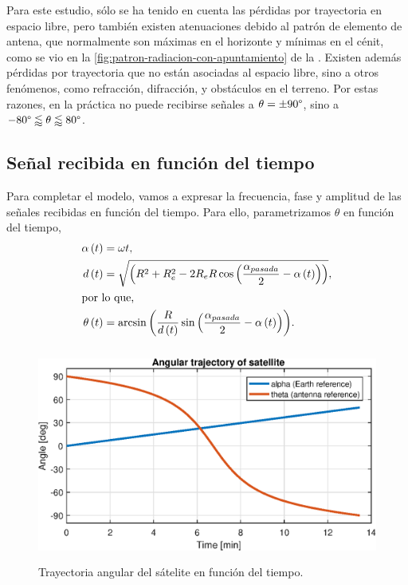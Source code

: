 \documentclass{article}
\newenvironment{standalone}{\begin{preview}}{\end{preview}}
\begin{document}
\begin{standalone}
  Para este estudio, sólo se ha tenido en cuenta las pérdidas por trayectoria en espacio libre, pero también existen atenuaciones debido al patrón de elemento de antena, que normalmente son máximas en el horizonte y mínimas en el cénit, como se vio en la \cref{fig:patron-radiacion-con-apuntamiento} de la .
  Existen además pérdidas por trayectoria que no están asociadas al espacio libre, sino a otros fenómenos, como refracción, difracción, y obstáculos en el terreno.
  Por estas razones, en la práctica no puede recibirse señales a $\theta = \pm 90 \degree$, sino a $-80\degree \lessapprox \theta \lessapprox 80\degree$.


  \subsection{Señal recibida en función del tiempo}

  Para completar el modelo, vamos a expresar la frecuencia, fase y amplitud de las señales recibidas en función del tiempo.
  Para ello, parametrizamos $\theta$ en función del tiempo,
  \begin{align}
    \alpha \left( t \right) &= \omega t, \\
    d \left( t \right) &= \sqrt{ \left( R^2 + R_e^2 - 2 R_e R \cos{ \left( \frac{\alpha_{pasada}}{2} - \alpha \left( t \right) \right) } \right) }, \\
    \intertext{por lo que,}
    \theta \left( t \right) &= \arcsin{ \left( \frac{R}{d \left( t \right) } \sin{ \left( \frac{\alpha_{pasada}}{2} - \alpha \left( t \right) \right) } \right) }.
  \end{align}

  \begin{figure}[!htbp]
    \centering
    \includegraphics[width=\linewidth, height=70mm, keepaspectratio]{../images/angular-trajectory-satellite.eps}
    \caption{Trayectoria angular del sátelite en función del tiempo.}
    \label{fig:angular-trajectory-satellite}
  \end{figure}


\end{standalone}
\end{document}
